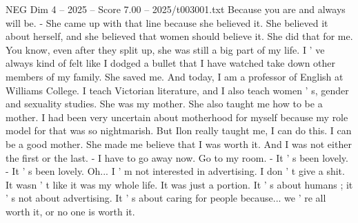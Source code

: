\begin{textsample}{NEG Dim 4 – 2025 – Score 7.00 – 2025/t003001.txt}
Because you are and always will be. - She came up with that line because she believed it.
She believed it about herself, and she believed that women should believe it.
She did that for me.
You know, even after they split up, she was still a big part of my life.
I ' ve always kind of felt like I dodged a bullet that I have watched take down other members of my family.
She saved me.
And today, I am a professor of English at Williams College.
I teach Victorian literature, and I also teach women ' s, gender and sexuality studies.
She was my mother.
She also taught me how to be a mother.
I had been very uncertain about motherhood for myself because my role model for that was so nightmarish.
But Ilon really taught me, I can do this.
I can be a good mother.
She made me believe that I was worth it.
And I was not either the first or the last. - I have to go away now.
Go to my room. - It ' s been lovely. - It ' s been lovely.
Oh...
I ' m not interested in advertising.
I don ' t give a shit.
It wasn ' t like it was my whole life.
It was just a portion.
It ' s about humans ; it ' s not about advertising.
It ' s about caring for people because... we ' re all worth it, or no one is worth it.

\end{textsample}
